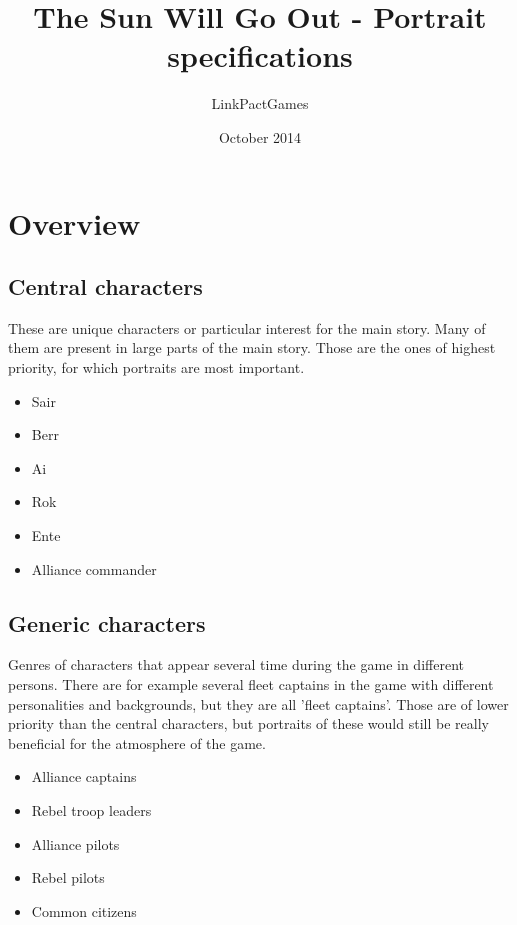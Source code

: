 \documentclass[a4paper,12pt]{article}
\begin{document}
\title{The Sun Will Go Out - Portrait specifications}
\author{LinkPactGames}
\date{October 2014}
\maketitle

\section{Overview}

\subsection{Central characters}

These are unique characters or particular interest for the main story. Many of them
are present in large parts of the main story. Those are the ones of highest priority,
for which portraits are most important.

\begin{itemize}
	\item{Sair}
	\item{Berr}
	\item{Ai}
	\item{Rok}
	\item{Ente}
	\item{Alliance commander}
\end{itemize}

\subsection{Generic characters}

Genres of characters that appear several time during the game in different persons.
There are for example several fleet captains in the game with different personalities and backgrounds,
but they are all 'fleet captains'. Those are of lower priority than the central characters, but portraits of these 
would still be really beneficial for the atmosphere of the game.

\begin{itemize}
	\item{Alliance captains}
	\item{Rebel troop leaders}
	\item{Alliance pilots}
	\item{Rebel pilots}
	\item{Common citizens}
\end{itemize}
\end{document}
